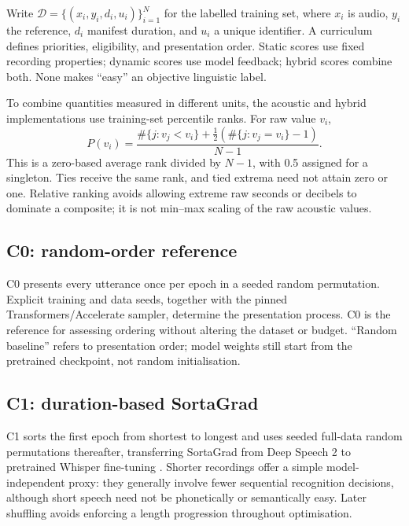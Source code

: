 \documentclass[12pt,a4paper]{report}
\begin{document}
Write $\mathcal D=\{(x_i,y_i,d_i,u_i)\}_{i=1}^{N}$ for the labelled training set, where $x_i$ is audio, $y_i$ the reference, $d_i$ manifest duration, and $u_i$ a unique identifier. A curriculum defines priorities, eligibility, and presentation order. Static scores use fixed recording properties; dynamic scores use model feedback; hybrid scores combine both. None makes ``easy'' an objective linguistic label.

To combine quantities measured in different units, the acoustic and hybrid implementations use training-set percentile ranks. For raw value $v_i$,
\begin{equation}
P(v_i)=\frac{\#\{j:v_j<v_i\}+\tfrac12(\#\{j:v_j=v_i\}-1)}{N-1}.
\label{eq:percentile}
\end{equation}
This is a zero-based average rank divided by $N-1$, with 0.5 assigned for a singleton. Ties receive the same rank, and tied extrema need not attain zero or one. Relative ranking avoids allowing extreme raw seconds or decibels to dominate a composite; it is not min--max scaling of the raw acoustic values.

\subsection{C0: random-order reference}

C0 presents every utterance once per epoch in a seeded random permutation. Explicit training and data seeds, together with the pinned Transformers/Accelerate sampler, determine the presentation process. C0 is the reference for assessing ordering without altering the dataset or budget. ``Random baseline'' refers to presentation order; model weights still start from the pretrained checkpoint, not random initialisation.

\subsection{C1: duration-based SortaGrad}

C1 sorts the first epoch from shortest to longest and uses seeded full-data random permutations thereafter, transferring SortaGrad from Deep Speech 2 to pretrained Whisper fine-tuning \citep{Amodei2016}. Shorter recordings offer a simple model-independent proxy: they generally involve fewer sequential recognition decisions, although short speech need not be phonetically or semantically easy. Later shuffling avoids enforcing a length progression throughout optimisation.
\end{document}
